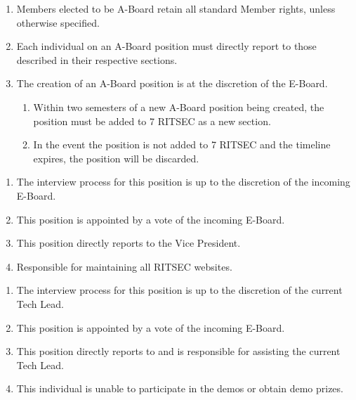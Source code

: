 

\begin{enumerate}
      \item Members elected to be A-Board retain all standard Member rights, unless
            otherwise specified.
      \item Each individual on an A-Board position must directly report to those described
            in their respective sections.
      \item The creation of an A-Board position is at the discretion of the E-Board.
            \begin{enumerate}
                  \item Within two semesters of a new A-Board position being created, the position must
                        be added to 7 RITSEC as a new section.
                  \item In the event the position is not added to 7 RITSEC and the timeline expires,
                        the position will be discarded.
            \end{enumerate}
\end{enumerate}


\begin{enumerate}
      \item The interview process for this position is up to the discretion of the incoming
            E-Board.
      \item This position is appointed by a vote of the incoming E-Board.
      \item This position directly reports to the Vice President.
      \item Responsible for maintaining all RITSEC websites.
\end{enumerate}


\begin{enumerate}
      \item The interview process for this position is up to the discretion of the current
            Tech Lead.
      \item This position is appointed by a vote of the incoming E-Board.
      \item This position directly reports to and is responsible for assisting the current
            Tech Lead.
      \item This individual is unable to participate in the demos or obtain demo prizes.
\end{enumerate}

